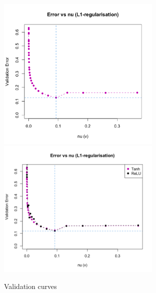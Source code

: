 \documentclass[12pt]{article}
\begin{document}
\begin{figure}[p]
\centering
\includegraphics[width=0.7\textwidth]{question_c_plot.png}
\includegraphics[width=0.7\textwidth]{question_d_plot.png}
\caption{Validation curves}
\label{fig:fig1}
\end{figure}
\end{document}
